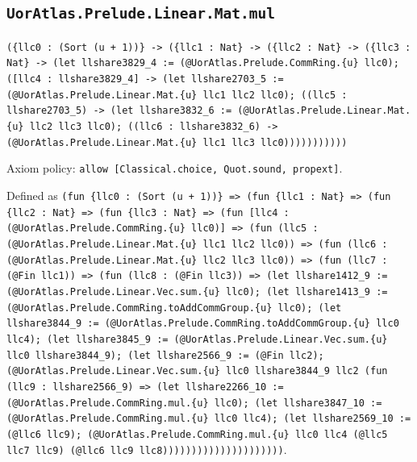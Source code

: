 \documentclass[11pt]{article}
\begin{document}
\subsection*{\texttt{UorAtlas.Prelude.Linear.Mat.mul}}
\noindent\texttt{(\{llc0 : (Sort (u + 1))\} -> (\{llc1 : Nat\} -> (\{llc2 : Nat\} -> (\{llc3 : Nat\} -> (let llshare3829\_4 := (@UorAtlas.Prelude.CommRing.\{u\} llc0); ([llc4 : llshare3829\_4] -> (let llshare2703\_5 := (@UorAtlas.Prelude.Linear.Mat.\{u\} llc1 llc2 llc0); ((llc5 : llshare2703\_5) -> (let llshare3832\_6 := (@UorAtlas.Prelude.Linear.Mat.\{u\} llc2 llc3 llc0); ((llc6 : llshare3832\_6) -> (@UorAtlas.Prelude.Linear.Mat.\{u\} llc1 llc3 llc0)))))))))))}\par
\noindent Axiom policy: \texttt{allow [Classical.choice, Quot.sound, propext]}.\par
\noindent Defined as \texttt{(fun \{llc0 : (Sort (u + 1))\} => (fun \{llc1 : Nat\} => (fun \{llc2 : Nat\} => (fun \{llc3 : Nat\} => (fun [llc4 : (@UorAtlas.Prelude.CommRing.\{u\} llc0)] => (fun (llc5 : (@UorAtlas.Prelude.Linear.Mat.\{u\} llc1 llc2 llc0)) => (fun (llc6 : (@UorAtlas.Prelude.Linear.Mat.\{u\} llc2 llc3 llc0)) => (fun (llc7 : (@Fin llc1)) => (fun (llc8 : (@Fin llc3)) => (let llshare1412\_9 := (@UorAtlas.Prelude.Linear.Vec.sum.\{u\} llc0); (let llshare1413\_9 := (@UorAtlas.Prelude.CommRing.toAddCommGroup.\{u\} llc0); (let llshare3844\_9 := (@UorAtlas.Prelude.CommRing.toAddCommGroup.\{u\} llc0 llc4); (let llshare3845\_9 := (@UorAtlas.Prelude.Linear.Vec.sum.\{u\} llc0 llshare3844\_9); (let llshare2566\_9 := (@Fin llc2); (@UorAtlas.Prelude.Linear.Vec.sum.\{u\} llc0 llshare3844\_9 llc2 (fun (llc9 : llshare2566\_9) => (let llshare2266\_10 := (@UorAtlas.Prelude.CommRing.mul.\{u\} llc0); (let llshare3847\_10 := (@UorAtlas.Prelude.CommRing.mul.\{u\} llc0 llc4); (let llshare2569\_10 := (@llc6 llc9); (@UorAtlas.Prelude.CommRing.mul.\{u\} llc0 llc4 (@llc5 llc7 llc9) (@llc6 llc9 llc8)))))))))))))))))))))}.\par
\end{document}
